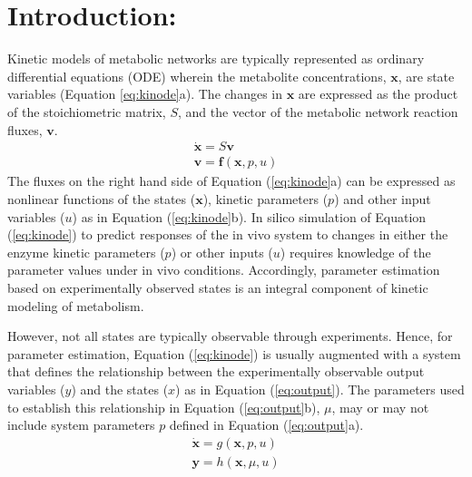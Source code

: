 \documentclass[10pt]{article}
\begin{document}
	\section{Introduction:}	
	Kinetic models of metabolic networks are typically represented as ordinary differential equations (ODE) wherein the metabolite concentrations, $\mathbf{x}$, are state variables (Equation \ref{eq:kinode}a). The changes in $\mathbf{x}$ are expressed as the product of the stoichiometric matrix, $S$, and the vector of the metabolic network reaction fluxes, $\mathbf{v}$. 
	\begin{subequations}\label{eq:kinode}
		\begin{align}
		\dot{\mathbf{x}} = S\mathbf{v}\\
		\mathbf{v} = \mathbf{f}(\mathbf{x}, p, u)
		\end{align}
	\end{subequations}	
	The fluxes on the right hand side of Equation (\ref{eq:kinode}a) can be expressed as nonlinear functions of the states ($\mathbf{x}$), kinetic parameters ($p$) and other input variables ($u$) as in Equation (\ref{eq:kinode}b). In silico simulation of Equation (\ref{eq:kinode}) to predict responses of the in vivo system to changes in either the enzyme kinetic parameters ($p$) or other inputs ($u$) requires knowledge of the parameter values under in vivo conditions. Accordingly, parameter estimation based on experimentally observed states is an integral component of kinetic modeling of metabolism. 
	
	However, not all states are typically observable through experiments. Hence, for parameter estimation, Equation (\ref{eq:kinode}) is usually augmented with a system that defines the relationship between the experimentally observable output variables ($y$) and the states ($x$) as in Equation (\ref{eq:output}). The parameters used to establish this relationship in Equation (\ref{eq:output}b), $\mu$, may or may not include system parameters $p$ defined in Equation (\ref{eq:output}a).
	\begin{subequations}\label{eq:output}
		\begin{align}
		\dot{\mathbf{x}} = g(\mathbf{x}, p, u)\\
		\mathbf{y} = h(\mathbf{x},\mu,u)
		\end{align}
	\end{subequations}
\end{document}
